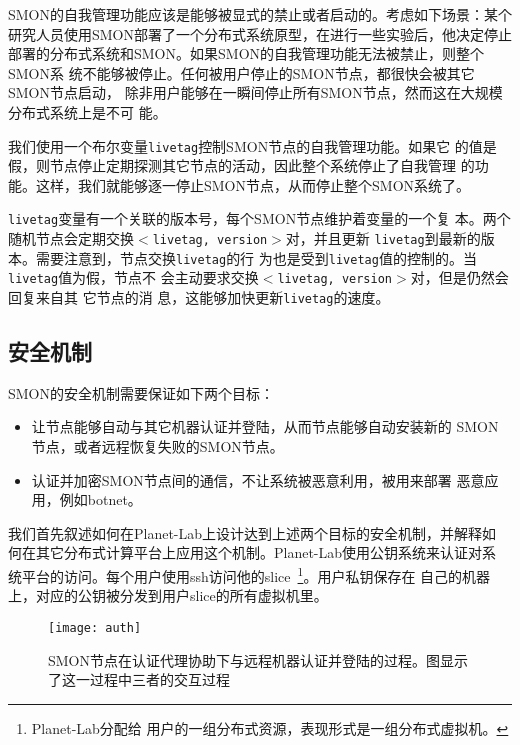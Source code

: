 SMON的自我管理功能应该是能够被显式的禁止或者启动的。考虑如下场景：某个
研究人员使用SMON部署了一个分布式系统原型，在进行一些实验后，他决定停止
部署的分布式系统和SMON。如果SMON的自我管理功能无法被禁止，则整个SMON系
统不能够被停止。任何被用户停止的SMON节点，都很快会被其它SMON节点启动，
除非用户能够在一瞬间停止所有SMON节点，然而这在大规模分布式系统上是不可
能。

我们使用一个布尔变量\texttt{livetag}控制SMON节点的自我管理功能。如果它
的值是假，则节点停止定期探测其它节点的活动，因此整个系统停止了自我管理
的功能。这样，我们就能够逐一停止SMON节点，从而停止整个SMON系统了。

\texttt{livetag}变量有一个关联的版本号，每个SMON节点维护着变量的一个复
本。两个随机节点会定期交换\texttt{$<$livetag, version$>$}对，并且更新
\texttt{livetag}到最新的版本。需要注意到，节点交换\texttt{livetag}的行
为也是受到\texttt{livetag}值的控制的。当\texttt{livetag}值为假，节点不
会主动要求交换\texttt{$<$livetag, version$>$}对，但是仍然会回复来自其
它节点的消
息，这能够加快更新\texttt{livetag}的速度。

\subsection{安全机制}
\label{subsec:security}

SMON的安全机制需要保证如下两个目标：

\begin{itemize}

  \item 让节点能够自动与其它机器认证并登陆，从而节点能够自动安装新的
  SMON节点，或者远程恢复失败的SMON节点。

  \item 认证并加密SMON节点间的通信，不让系统被恶意利用，被用来部署
  恶意应用，例如botnet。

\end{itemize}

我们首先叙述如何在Planet-Lab上设计达到上述两个目标的安全机制，并解释如
何在其它分布式计算平台上应用这个机制。Planet-Lab使用公钥系统来认证对系
统平台的访问。每个用户使用ssh访问他的slice~\footnote{Planet-Lab分配给
用户的一组分布式资源，表现形式是一组分布式虚拟机。}。用户私钥保存在
自己的机器上，对应的公钥被分发到用户slice的所有虚拟机里。

\begin{figure}
\centering
  \begin{minipage}{0.8\linewidth}
    \centering
    \texttt{[image: auth]}
    \caption{SMON节点在认证代理协助下与远程机器认证并登陆的过程。图显示
    了这一过程中三者的交互过程}
    \label{fig:auth}
  \end{minipage}
\end{figure}

